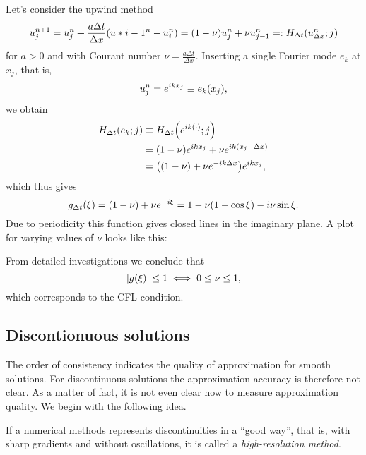 \begin{example}
	Let's consider the upwind method
	\[
		u_j^{n + 1} = u_j^n + \frac{a\Delta t}{\Delta x}\parentheses*{u*{i - 1}^n - u_i^n} = \parentheses*{1 - \nu}u_j^n + \nu u_{j - 1}^n =: H_{\Delta t}\parentheses*{u_{\Delta x}^n; j}
	\]
	for \(a > 0\) and with Courant number \(\nu = \frac{a\Delta t}{\Delta x}\).
	Inserting a single Fourier mode \(e_k\) at \(x_j\), that is,
	\[
		u_j^n = e^{ikx_j} \equiv e_k\parentheses*{x_j},
	\]
	we obtain
	\begin{align*}
		H_{\Delta t}\parentheses*{e_k; j} &\equiv H_{\Delta t}\parentheses*{e^{ik\parentheses*{\cdot}}; j}\\
		&= \parentheses*{1 - \nu}e^{ikx_j} + \nu e^{ik\parentheses*{x_j - \Delta x}}\\
		&= \parentheses*{\parentheses*{1 - \nu} + \nu e^{-ik\Delta x}}e^{ikx_j},
	\end{align*}
	which thus gives
	\[
		g_{\Delta t}\parentheses*{\xi} = \parentheses*{1 - \nu} + \nu e^{-i\xi} = 1 - \nu\parentheses*{1 - \cos\xi} - i\nu\sin\xi.
	\]
	Due to periodicity this function gives closed lines in the imaginary plane.
	A plot for varying values of \(\nu\) looks like this:
	\begin{center}
	\end{center}
	From detailed investigations we conclude that
	\[
		\absolute*{g\parentheses*{\xi}} \le 1 \iff 0 \le \nu \le 1,
	\]
	which corresponds to the CFL condition.
\end{example}


\subsection{Discontionuous solutions}

The order of consistency indicates the quality of approximation for smooth solutions.
For discontinuous solutions the approximation accuracy is therefore not clear.
As a matter of fact, it is not even clear how to measure approximation quality.
We begin with the following idea.

\begin{definition}
	If a numerical methods represents discontinuities in a ``good way'', that is, with sharp gradients and without oscillations, it is called a \emph{high-resolution method}.
\end{definition}

